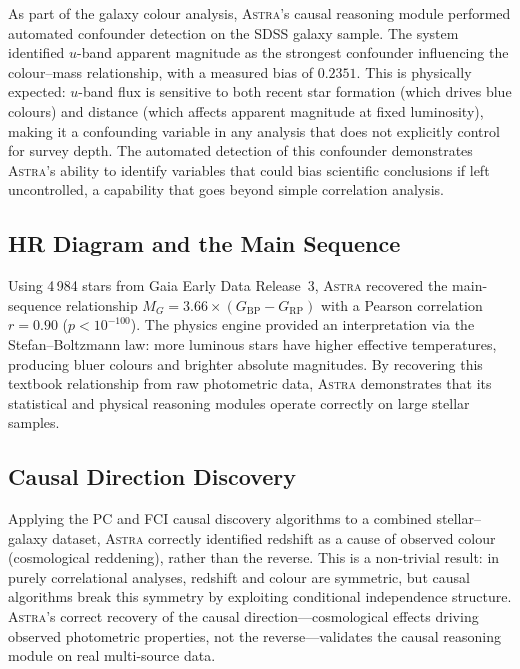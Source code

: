 \documentclass[fleqn,usenatbib]{mnras}
\newcommand{\astra}{\textsc{Astra}\xspace}
\newcommand{\pc}{PC\xspace}
\newcommand{\fci}{FCI\xspace}
\begin{document}
As part of the galaxy colour analysis, \astra's causal reasoning module performed automated confounder detection on the SDSS galaxy sample.
The system identified $u$-band apparent magnitude as the strongest confounder influencing the colour--mass relationship, with a measured bias of $0.2351$.
This is physically expected: $u$-band flux is sensitive to both recent star formation (which drives blue colours) and distance (which affects apparent magnitude at fixed luminosity), making it a confounding variable in any analysis that does not explicitly control for survey depth.
The automated detection of this confounder demonstrates \astra's ability to identify variables that could bias scientific conclusions if left uncontrolled, a capability that goes beyond simple correlation analysis.

\subsection{HR Diagram and the Main Sequence}
\label{sec:live:hr}

Using 4\,984 stars from Gaia Early Data Release~3, \astra recovered the main-sequence relationship $M_{G} = 3.66 \times (G_{\mathrm{BP}} - G_{\mathrm{RP}})$ with a Pearson correlation $r = 0.90$ ($p < 10^{-100}$).
The physics engine provided an interpretation via the Stefan--Boltzmann law: more luminous stars have higher effective temperatures, producing bluer colours and brighter absolute magnitudes.
By recovering this textbook relationship from raw photometric data, \astra demonstrates that its statistical and physical reasoning modules operate correctly on large stellar samples.

\subsection{Causal Direction Discovery}
\label{sec:live:causal}

Applying the \pc and \fci \citep{Zhang2008} causal discovery algorithms to a combined stellar--galaxy dataset, \astra correctly identified redshift as a cause of observed colour (cosmological reddening), rather than the reverse.
This is a non-trivial result: in purely correlational analyses, redshift and colour are symmetric, but causal algorithms break this symmetry by exploiting conditional independence structure.
\astra's correct recovery of the causal direction---cosmological effects driving observed photometric properties, not the reverse---validates the causal reasoning module on real multi-source data.
\end{document}

